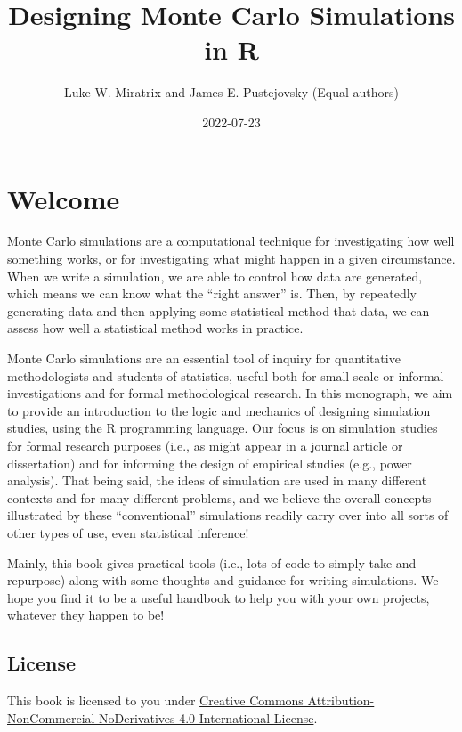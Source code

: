 \documentclass[
]{book}
\title{Designing Monte Carlo Simulations in R}
\author{Luke W. Miratrix and James E. Pustejovsky
(Equal authors)}
\date{2022-07-23}
\begin{document}
\maketitle

{
\setcounter{tocdepth}{1}
\tableofcontents
}
\hypertarget{welcome}{%
\chapter*{Welcome}\label{welcome}}

Monte Carlo simulations are a computational technique for investigating how well something works, or for investigating what might happen in a given circumstance.
When we write a simulation, we are able to control how data are generated, which means we can know what the ``right answer'' is.
Then, by repeatedly generating data and then applying some statistical method that data, we can assess how well a statistical method works in practice.

Monte Carlo simulations are an essential tool of inquiry for quantitative methodologists and students of statistics, useful both for small-scale or informal investigations and for formal methodological research.
In this monograph, we aim to provide an introduction to the logic and mechanics of designing simulation studies, using the R programming language.
Our focus is on simulation studies for formal research purposes (i.e., as might appear in a journal article or dissertation) and for informing the design of empirical studies (e.g., power analysis).
That being said, the ideas of simulation are used in many different contexts and for many different problems, and we believe the overall concepts illustrated by these ``conventional'' simulations readily carry over into all sorts of other types of use, even statistical inference!

Mainly, this book gives practical tools (i.e., lots of code to simply take and repurpose) along with some thoughts and guidance for writing simulations.
We hope you find it to be a useful handbook to help you with your own projects, whatever they happen to be!

\hypertarget{license}{%
\section*{License}\label{license}}

This book is licensed to you under \href{http://creativecommons.org/licenses/by-nc-nd/4.0/}{Creative Commons Attribution-NonCommercial-NoDerivatives 4.0 International License}.
\end{document}
